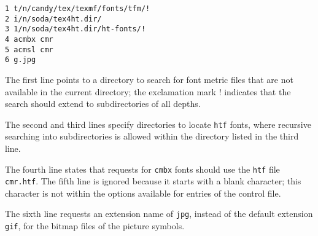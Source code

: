 \begin{verbatim}
1 t/n/candy/tex/texmf/fonts/tfm/! 
2 i/n/soda/tex4ht.dir/ 
3 1/n/soda/tex4ht.dir/ht-fonts/! 
4 acmbx cmr 
5 acmsl cmr 
6 g.jpg
\end{verbatim}

The first line points to a directory to search for font metric files that are not 
available in the current directory; the exclamation mark ! indicates that the search 
should extend to subdirectories of all depths. 

The second and third lines specify directories to locate \verb|htf|
fonts, where recursive searching into subdirectories is allowed within
the directory listed in the third line. 

The fourth line states that requests for \verb|cmbx| fonts should use
the \verb|htf| file \verb|cmr.htf|. The fifth line is ignored because it
starts with a blank character; this character is not within the options
available for entries of the control file. 

The sixth line requests an extension name of \verb|jpg|, instead of the
default extension \verb|gif|, for the bitmap files of the picture
symbols. 
 
 
